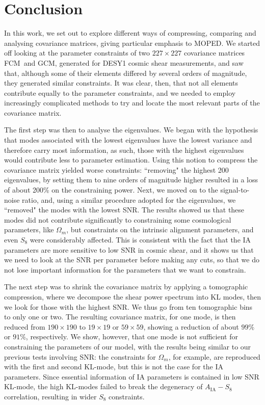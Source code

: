 \documentclass[twocolumn]{\docclass}
\newcommand\full{FCM}
\newcommand\gaussian{GCM}
\begin{document}
	\section{Conclusion}
	\label{sec:conclusion}
	
	In this work, we set out to explore different ways of compressing, comparing and analysing covariance matrices, giving particular emphasis to MOPED. We started off looking at the parameter constraints of two $227 \times 227$ covariance matrices \full\ and \gaussian, generated for DESY1 cosmic shear measurements, and saw that, although some of their elements differed by several orders of magnitude, they generated similar constraints. It was clear, then, that not all elements contribute equally to the parameter constraints, and we needed to employ increasingly complicated methods to try and locate the most relevant parts of the covariance matrix.
	
	The first step was then to analyse the eigenvalues. We began with the hypothesis that modes associated with the lowest eigenvalues have the lowest variance and therefore carry most information, as such, those with the highest eigenvalues would contribute less to parameter estimation. Using this notion to compress the covariance matrix yielded worse constraints: ``removing" the highest 200 eigenvalues, by setting them to nine orders of magnitude higher resulted in a loss of about 200\% on the constraining power. Next, we moved on to the signal-to-noise ratio, and, using a similar procedure adopted for the eigenvalues, we ``removed" the modes with the lowest SNR. The results showed us that these modes did not contribute significantly to constraining some cosmological parameters, like $\Omega_m$, but constraints on the intrinsic alignment parameters, and even $S_8$ were considerably affected. This is consistent with the fact that the IA parameters are more sensitive to low SNR in cosmic shear, and it shows us that we need to look at the SNR per parameter before making any cuts, so that we do not lose important information for the parameters that we want to constrain.
	
	The next step was to shrink the covariance matrix by applying a tomographic compression, where we decompose the shear power spectrum into KL modes, then we look for those with the highest SNR. We thus go from ten tomographic bins to only one or two. The resulting covariance matrix, for one mode, is then reduced from $190 \times 190$ to $19 \times 19$ or $59 \times 59$, showing a reduction of about $99\%$ or $91\%$, respectively. We show, however, that one mode is not sufficient for constraining the parameters of our model, with the results being similar to our previous tests involving SNR: the constraints for $\Omega_m$, for example, are reproduced with the first and second KL-mode, but this is not the case for the IA parameters. Since essential information of IA parameters is contained in low SNR KL-mode, the high KL-modes failed to break the degeneracy of $A_{\mathrm{IA}}-S_8$ correlation, resulting in wider $S_8$ constraints. 
	
\end{document}

